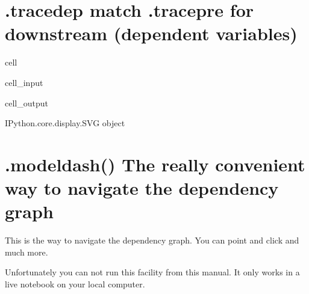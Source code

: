 \documentclass[letterpaper,10pt,english]{jupyterBook}
\begin{document}
\section{.tracedep match .tracepre for downstream (dependent variables)}
\label{\detokenize{content/howto/structure/Logical_structure:tracedep-match-tracepre-for-downstream-dependent-variables}}
\begin{sphinxuseclass}{cell}\begin{sphinxVerbatimInput}

\begin{sphinxuseclass}{cell_input}
\begin{sphinxVerbatim}[commandchars=\\\{\}]
\end{sphinxVerbatim}

\end{sphinxuseclass}\end{sphinxVerbatimInput}
\begin{sphinxVerbatimOutput}

\begin{sphinxuseclass}{cell_output}
\begin{sphinxVerbatim}[commandchars=\\\{\}]
\PYGZlt{}IPython.core.display.SVG object\PYGZgt{}
\end{sphinxVerbatim}

\end{sphinxuseclass}\end{sphinxVerbatimOutput}

\end{sphinxuseclass}

\section{.modeldash() The really convenient  way to navigate the dependency graph}
\label{\detokenize{content/howto/structure/Logical_structure:modeldash-the-really-convenient-way-to-navigate-the-dependency-graph}}
\sphinxAtStartPar
This is the way to navigate the dependency graph. You can point and click and much more.

\sphinxAtStartPar
Unfortunately you can not run this facility from this manual. It only works in a live notebook on your local computer.
\end{document}
